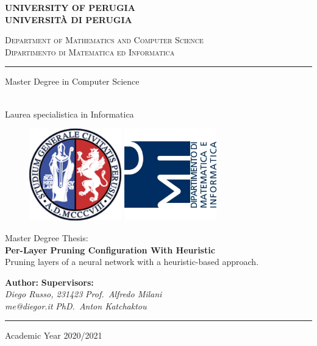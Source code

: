 \begin{titlepage}
    \begin{center}
        \textbf{\Large UNIVERSITY OF PERUGIA}\\
        \textbf{UNIVERSITÀ DI PERUGIA}
        \vspace{0.5cm}

        \scshape{Department of Mathematics and Computer Science}\\
        \scshape{Dipartimento di Matematica ed Informatica}

        \rule[1mm]{\textwidth}{0.2mm}
        \vspace{0.5cm}

        \begin{Large}Master Degree in Computer Science\end{Large}\\
        Laurea specialistica in Informatica
        \vspace{0.5cm}

        \begin{figure}[htbp]
            \begin{center}
                \includegraphics[width=4cm]{images/unipg_logo.png}
                \includegraphics[width=4cm]{images/dmi_logo.png}
            \end{center}
        \end{figure}

        Master Degree Thesis:\\
        \vspace{0.5cm}
        \textbf{\LARGE Per-Layer Pruning Configuration With Heuristic}\\
        \vspace{0.3cm}
        Pruning layers of a neural network with a heuristic-based approach.\\
        \vspace{2cm}

        \textbf{Author:} \hfill \textbf{Supervisors:}\\
        \textit{Diego Russo, 231423} \hfill \textit{Prof.\ Alfredo Milani}\\
        \textit{me@diegor.it} \hfill \textit{PhD.\ Anton Katchaktou}

        \rule[1mm]{\textwidth}{0.2mm}
        \small{Academic Year 2020/2021}
    \end{center}
\end{titlepage}